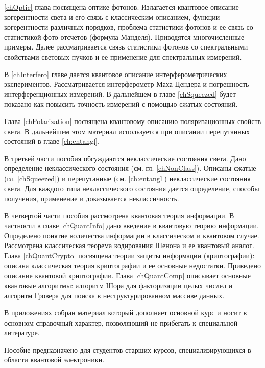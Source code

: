 \ref{chOptic} глава посвящена оптике фотонов. Излагается квантовое описание
когерентности света и его связь с классическим описанием, функции
когерентности различных порядков, проблема статистики фотонов и ее
связь со статистикой фото-отсчетов (формула Манделя). Приводятся
многочисленные примеры. Далее рассматривается связь статистики фотонов
со спектральными свойствами световых пучков и ее применение для
спектральных измерений.

В \ref{chInterfero} главе дается квантовое описание интерферометрических
экспериментов. Рассматривается интерферометр Маха-Цендера и
погрешность интерференционных измерений. В дальнейшем в главе
\ref{chSqueezed} будет показано как повысить точность измерений с
помощью сжатых состояний.

Глава \ref{chPolarization} посвящена квантовому описанию
поляризационных свойств света. В дальнейшем этом материал используется
при описании перепутанных состояний в главе \ref{ch:entangl}.

В третьей части пособия обсуждаются неклассические
состояния света. Дано определение неклассического состояния
(см. гл. \ref{chNonClass}). Описаны 
сжатые (гл. \ref{chSqueezed}) и перепутанные (см.  \autoref{ch:entangl})
неклассические состояния света. Для каждого типа неклассического
состояния дается определение, способы получения, применение и доказывается
неклассичность.  

В четвертой части пособия рассмотрена квантовая теория информации. В
частности в главе \ref{chQuantInfo} дано введение в квантовую теорию
информации. Определено понятие количества 
информации в классическом и квантовом случае. Рассмотрена классическая
теорема кодирования Шенона и ее квантовый аналог. Глава
\ref{chQuantCrypto} посвящена 
теории защиты информации (криптографии): описана классическая
теория криптографии и ее основные недостатки. Приведено описание
квантовой криптографии. Глава \ref{chQuantComp} описывает основные квантовые
алгоритмы: алгоритм Шора для факторизации целых числел и алгоритм
Гровера для поиска в неструктурированном массиве данных.

В приложениях собран материал который дополняет основной курс и носит
в основном справочный характер, позволяющий не прибегать к специальной
литературе. 

Пособие предназначено для студентов старших курсов, специализирующихся
в области квантовой электроники.  
